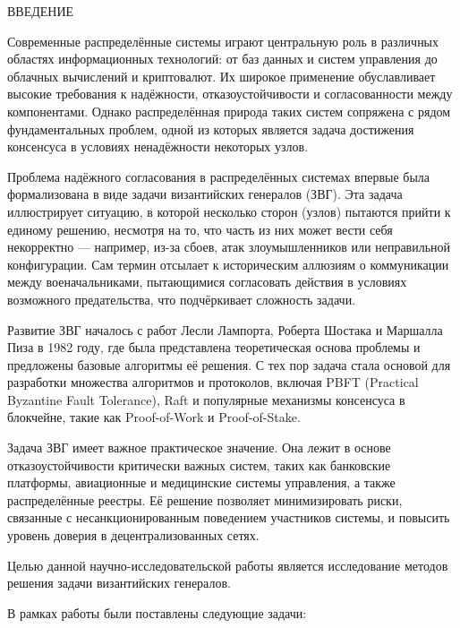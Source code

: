 \begin{center}
    \MakeUppercase{\large Введение}
\end{center}

Современные распределённые системы играют центральную роль в различных областях информационных технологий: от баз данных и систем управления до облачных вычислений и криптовалют. Их широкое применение обуславливает высокие требования к надёжности, отказоустойчивости и согласованности между компонентами. Однако распределённая природа таких систем сопряжена с рядом фундаментальных проблем, одной из которых является задача достижения консенсуса в условиях ненадёжности некоторых узлов.

Проблема надёжного согласования в распределённых системах впервые была формализована в виде задачи византийских генералов (ЗВГ). Эта задача иллюстрирует ситуацию, в которой несколько сторон (узлов) пытаются прийти к единому решению, несмотря на то, что часть из них может вести себя некорректно — например, из-за сбоев, атак злоумышленников или неправильной конфигурации. Сам термин отсылает к историческим аллюзиям о коммуникации между военачальниками, пытающимися согласовать действия в условиях возможного предательства, что подчёркивает сложность задачи.

Развитие ЗВГ началось с работ Лесли Лампорта, Роберта Шостака и Маршалла Пиза в 1982 году, где была представлена теоретическая основа проблемы и предложены базовые алгоритмы её решения. С тех пор задача стала основой для разработки множества алгоритмов и протоколов, включая PBFT (Practical Byzantine Fault Tolerance), Raft и популярные механизмы консенсуса в блокчейне, такие как Proof-of-Work и Proof-of-Stake.

Задача ЗВГ имеет важное практическое значение. Она лежит в основе отказоустойчивости критически важных систем, таких как банковские платформы, авиационные и медицинские системы управления, а также распределённые реестры. Её решение позволяет минимизировать риски, связанные с несанкционированным поведением участников системы, и повысить уровень доверия в децентрализованных сетях.

Целью данной научно-исследовательской работы является исследование методов решения задачи византийских генералов.

\vspace{0.25cm}
В рамках работы были поставлены следующие задачи:

